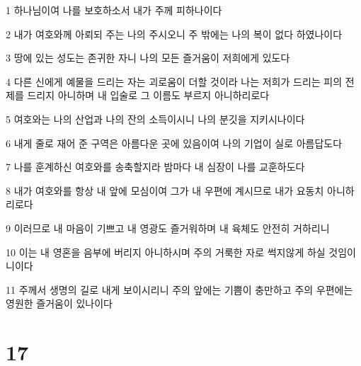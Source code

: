 \par 1 하나님이여 나를 보호하소서 내가 주께 피하나이다
\par 2 내가 여호와께 아뢰되 주는 나의 주시오니 주 밖에는 나의 복이 없다 하였나이다
\par 3 땅에 있는 성도는 존귀한 자니 나의 모든 즐거움이 저희에게 있도다
\par 4 다른 신에게 예물을 드리는 자는 괴로움이 더할 것이라 나는 저희가 드리는 피의 전제를 드리지 아니하며 내 입술로 그 이름도 부르지 아니하리로다
\par 5 여호와는 나의 산업과 나의 잔의 소득이시니 나의 분깃을 지키시나이다
\par 6 내게 줄로 재어 준 구역은 아름다운 곳에 있음이여 나의 기업이 실로 아름답도다
\par 7 나를 훈계하신 여호와를 송축할지라 밤마다 내 심장이 나를 교훈하도다
\par 8 내가 여호와를 항상 내 앞에 모심이여 그가 내 우편에 계시므로 내가 요동치 아니하리로다
\par 9 이러므로 내 마음이 기쁘고 내 영광도 즐거워하며 내 육체도 안전히 거하리니
\par 10 이는 내 영혼을 음부에 버리지 아니하시며 주의 거룩한 자로 썩지않게 하실 것임이니이다
\par 11 주께서 생명의 길로 내게 보이시리니 주의 앞에는 기쁨이 충만하고 주의 우편에는 영원한 즐거움이 있나이다

\chapter{17}

